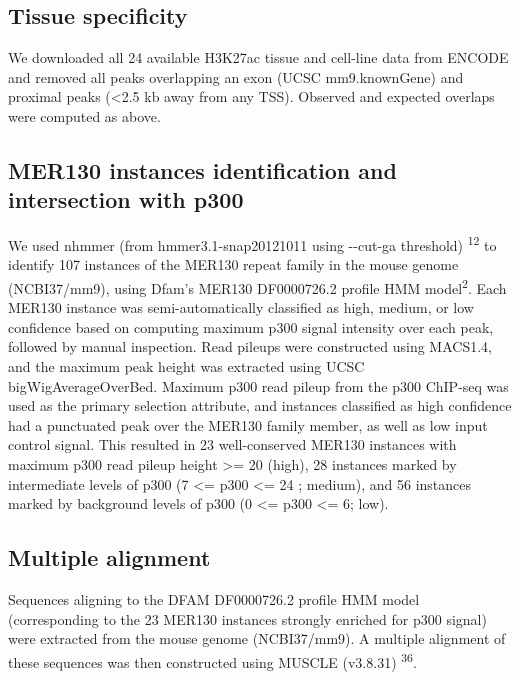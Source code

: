 \documentclass[]{article}
\begin{document}
\subsection{Tissue specificity}\label{tissue-specificity}

We downloaded all 24 available H3K27ac tissue and cell-line data from
ENCODE and removed all peaks overlapping an exon (UCSC mm9.knownGene)
and proximal peaks (\textless{}2.5 kb away from any TSS). Observed and
expected overlaps were computed as above.

\subsection{MER130 instances identification and intersection with
p300}\label{mer130-instances-identification-and-intersection-with-p300}

We used nhmmer (from hmmer3.1-snap20121011 using -\/-cut-ga threshold)
\textsuperscript{12} to identify 107 instances of the MER130 repeat
family in the mouse genome (NCBI37/mm9), using Dfam's MER130 DF0000726.2
profile HMM model\textsuperscript{2}. Each MER130 instance was
semi-automatically classified as high, medium, or low confidence based
on computing maximum p300 signal intensity over each peak, followed by
manual inspection. Read pileups were constructed using MACS1.4, and the
maximum peak height was extracted using UCSC bigWigAverageOverBed.
Maximum p300 read pileup from the p300 ChIP-seq was used as the primary
selection attribute, and instances classified as high confidence had a
punctuated peak over the MER130 family member, as well as low input
control signal. This resulted in 23 well-conserved MER130 instances with
maximum p300 read pileup height \textgreater{}= 20 (high), 28 instances
marked by intermediate levels of p300 (7 \textless{}= p300 \textless{}=
24 ; medium), and 56 instances marked by background levels of p300 (0
\textless{}= p300 \textless{}= 6; low).

\subsection{Multiple alignment}\label{multiple-alignment}

Sequences aligning to the DFAM DF0000726.2 profile HMM model
(corresponding to the 23 MER130 instances strongly enriched for p300
signal) were extracted from the mouse genome (NCBI37/mm9). A multiple
alignment of these sequences was then constructed using MUSCLE (v3.8.31)
\textsuperscript{36}.
\end{document}
